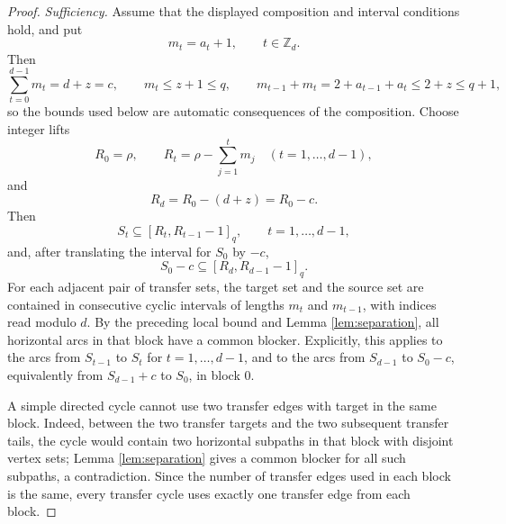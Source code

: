 \documentclass[11pt]{article}
\theoremstyle{definition}
\theoremstyle{remark}
\begin{document}
\begin{proof}
\noindent\emph{Sufficiency.}
Assume that the displayed composition and interval conditions hold, and put
\[
        m_t=a_t+1,
        \qquad t\in\mathbb Z_d.
\]
Then
\[
        \sum_{t=0}^{d-1}m_t=d+z=c,
        \qquad
        m_t\le z+1\le q,
        \qquad
        m_{t-1}+m_t=2+a_{t-1}+a_t\le 2+z\le q+1,
\]
so the bounds used below are automatic consequences of the composition. Choose integer lifts
\[
        R_0=\rho,
        \qquad
        R_t=\rho-\sum_{j=1}^t m_j\quad (t=1,\ldots,d-1),
\]
and
\[
        R_d=R_0-(d+z)=R_0-c .
\]
Then
\begin{equation}
        S_t\subseteq [R_t,R_{t-1}-1]_q,
        \qquad t=1,\ldots,d-1,
        \label{eq:suff-incl1}
\end{equation}
and, after translating the interval for $S_0$ by $-c$,
\begin{equation}
        S_0-c\subseteq [R_d,R_{d-1}-1]_q .
        \label{eq:suff-incl0}
\end{equation}
For each adjacent pair of transfer sets, the target set and the source set are contained in consecutive cyclic intervals of lengths $m_t$ and $m_{t-1}$, with indices read modulo $d$. By the preceding local bound and Lemma \ref{lem:separation}, all horizontal arcs in that block have a common blocker. Explicitly, this applies to the arcs from $S_{t-1}$ to $S_t$ for $t=1,\ldots,d-1$, and to the arcs from $S_{d-1}$ to $S_0-c$, equivalently from $S_{d-1}+c$ to $S_0$, in block $0$.

A simple directed cycle cannot use two transfer edges with target in the
same block.  Indeed, between the two transfer targets and the two subsequent
transfer tails, the cycle would contain two horizontal subpaths in that
block with disjoint vertex sets; Lemma \ref{lem:separation} gives a common
blocker for all such subpaths, a contradiction.  Since the number of
transfer edges used in each block is the same, every transfer cycle uses
exactly one transfer edge from each block.


\end{proof}
\end{document}
